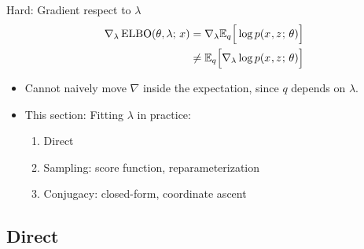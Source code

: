 \begin{frame}
Hard: Gradient respect to $\lambda$ 
\begin{align*}
\nabla_{\lambda} \operatorname*{ELBO}(\theta, \lambda ; \, x) &=  \nabla_\lambda \mathbb{E}_{ q}\Big[ \log p(x^{}, z^{} ; \, \theta) \Big] \\
&\ne \mathbb{E}_{q}\Big[\nabla_{\lambda} \log p(x^{}, z^{} ; \, \theta) \Big] 
\end{align*}
\begin{itemize}
    \item Cannot naively move $\nabla$ inside the expectation, since  $q$ depends on $\lambda$.
    \item This section: Fitting $\lambda$ in practice:
        \begin{enumerate}
        \item Direct 
        \item Sampling: score function, reparameterization
        \item Conjugacy: closed-form, coordinate ascent
    \end{enumerate}

\end{itemize}
\end{frame}


 

\subsection{Direct}

